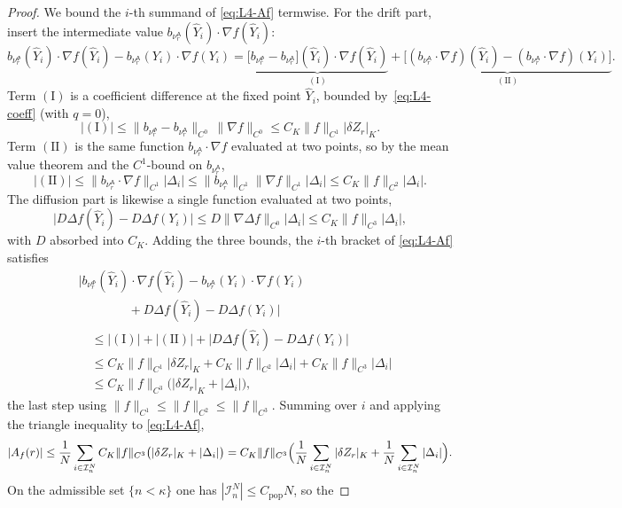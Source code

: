 \documentclass[a4paper,fleqn]{cas-sc}
\theoremstyle{definition}
\theoremstyle{remark}
\begin{document}
\begin{proof}
We bound the $i$-th summand of \eqref{eq:L4-Af} termwise. For the drift part, insert
the intermediate value $b_{\nu^{\mathsf A}_r}(\widehat Y_i)\cdot\nabla f(\widehat Y_i)$:
\[
b_{\nu^\Phi_r}(\widehat Y_i)\!\cdot\!\nabla f(\widehat Y_i)
-b_{\nu^{\mathsf A}_r}(Y_i)\!\cdot\!\nabla f(Y_i)
=\underbrace{\bigl[b_{\nu^\Phi_r}-b_{\nu^{\mathsf A}_r}\bigr](\widehat Y_i)\!\cdot\!\nabla f(\widehat Y_i)}_{(\mathrm I)}
+\underbrace{\bigl[(b_{\nu^{\mathsf A}_r}\!\cdot\!\nabla f)(\widehat Y_i)-(b_{\nu^{\mathsf A}_r}\!\cdot\!\nabla f)(Y_i)\bigr]}_{(\mathrm{II})}.
\]
Term $(\mathrm I)$ is a coefficient difference at the fixed point $\widehat Y_i$, bounded
by~\eqref{eq:L4-coeff} (with $q=0$),
\[
|(\mathrm I)|\le\|b_{\nu^\Phi_r}-b_{\nu^{\mathsf A}_r}\|_{C^0}\,\|\nabla f\|_{C^0}
\le C_K\|f\|_{C^1}|\delta Z_r|_K .
\]
Term $(\mathrm{II})$ is the same function $b_{\nu^{\mathsf A}_r}\!\cdot\!\nabla f$ evaluated at
two points, so by the mean value theorem and the $C^1$-bound on $b_{\nu^{\mathsf A}_r}$,
\[
|(\mathrm{II})|\le\|b_{\nu^{\mathsf A}_r}\!\cdot\!\nabla f\|_{C^1}|\Delta_i|
\le\|b_{\nu^{\mathsf A}_r}\|_{C^1}\|\nabla f\|_{C^1}|\Delta_i|
\le C_K\|f\|_{C^2}|\Delta_i| .
\]
The diffusion part is likewise a single function evaluated at two points,
\[
\bigl|D\Delta f(\widehat Y_i)-D\Delta f(Y_i)\bigr|
\le D\|\nabla\Delta f\|_{C^0}|\Delta_i|\le C_K\|f\|_{C^3}|\Delta_i| ,
\]
with $D$ absorbed into $C_K$. Adding the three bounds, the $i$-th bracket of \eqref{eq:L4-Af} satisfies
\[
\begin{aligned}
&\bigl|b_{\nu^\Phi_r}(\widehat Y_i)\!\cdot\!\nabla f(\widehat Y_i)
-b_{\nu^{\mathsf A}_r}(Y_i)\!\cdot\!\nabla f(Y_i)\\
&\qquad\qquad+D\Delta f(\widehat Y_i)-D\Delta f(Y_i)\bigr|\\
&\quad\le|(\mathrm I)|+|(\mathrm{II})|+\bigl|D\Delta f(\widehat Y_i)-D\Delta f(Y_i)\bigr|\\
&\quad\le C_K\|f\|_{C^1}|\delta Z_r|_K+C_K\|f\|_{C^2}|\Delta_i|+C_K\|f\|_{C^3}|\Delta_i|\\
&\quad\le C_K\|f\|_{C^3}\bigl(|\delta Z_r|_K+|\Delta_i|\bigr),
\end{aligned}
\]
the last step using $\|f\|_{C^1}\le\|f\|_{C^2}\le\|f\|_{C^3}$. Summing over $i$ and applying the
triangle inequality to \eqref{eq:L4-Af},
\[
|A_f(r)|
\le\frac1N\sum_{i\in\mathcal I^N_n}C_K\|f\|_{C^3}\bigl(|\delta Z_r|_K+|\Delta_i|\bigr)
=C_K\|f\|_{C^3}\Bigl(\frac1N\sum_{i\in\mathcal I^N_n}|\delta Z_r|_K
+\frac1N\sum_{i\in\mathcal I^N_n}|\Delta_i|\Bigr).
\]
On the admissible set $\{n<\kappa\}$ one has $|\mathcal I^N_n|\le C_{\mathrm{pop}}N$, so the

\end{proof}
\end{document}
